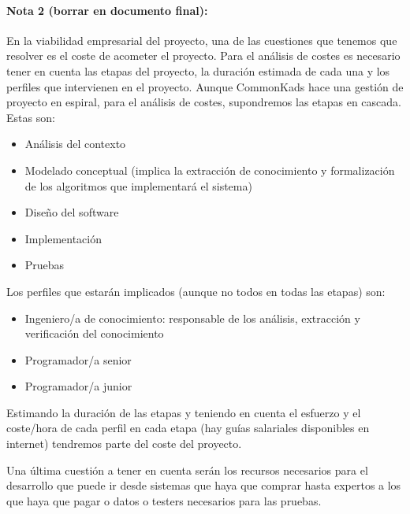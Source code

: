 \documentclass[12pt,a4paper,twoside,spanish]{article}      %
\begin{document}
\paragraph{Nota 2 (borrar en documento final): } En la viabilidad empresarial del proyecto, una de las cuestiones que tenemos que resolver es el coste de acometer el proyecto. Para el análisis de costes es necesario tener en cuenta las etapas del proyecto, la duración estimada de cada una y los perfiles que intervienen en el proyecto. Aunque CommonKads hace una gestión de proyecto en espiral, para el análisis de costes, supondremos las etapas en cascada. Estas son:
 \begin{itemize}
 	\item Análisis del contexto
 	\item Modelado conceptual (implica la extracción de conocimiento y formalización de los algoritmos que implementará el sistema)
 	\item Diseño del software
 	\item Implementación
 	\item Pruebas 	
 \end{itemize}

Los perfiles que estarán implicados (aunque no todos en todas las etapas) son: 
\begin{itemize}
	\item Ingeniero/a de conocimiento: responsable de los análisis, extracción y verificación del conocimiento
	\item Programador/a senior
	\item Programador/a junior
\end{itemize}

Estimando la duración de las etapas y teniendo en cuenta el esfuerzo y el coste/hora de cada perfil en cada etapa (hay guías salariales disponibles en internet) tendremos parte del coste del proyecto.

Una última cuestión a tener en cuenta serán los recursos necesarios para el desarrollo que puede ir desde sistemas que haya que comprar hasta expertos a los que haya que pagar o datos o testers necesarios para las pruebas.  
\end{document}

